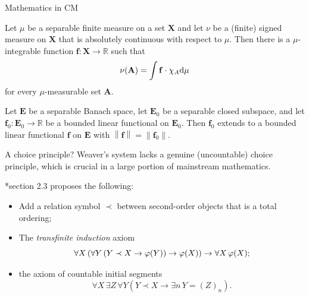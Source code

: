 \documentclass{beamer}
\begin{document}
\begin{frame}{Mathematics in $\mathrm{CM}$}
  \begin{theorem} Let $\mu$ be a separable finite measure on a set $\mathbf{X}$ and let $\nu$ be a (finite) signed measure on $\mathbf{X}$ that is absolutely continuous with respect to $\mu$. Then there is a $\mu$-integrable function $\mathbf{f} : \mathbf{X} \rightarrow \mathbb{R}$ such that
    \[\nu\mleft(\mathbf{A}\mright) = \int \mathbf{f} \cdot \chi_A \mathrm{d}\mu\]
    for every $\mu$-measurable set $\mathbf{A}$.
  \end{theorem}

  \vspace{1em}

  \begin{theorem}
    Let $\mathbf{E}$ be a separable Banach space, let $\mathbf{E}_0$ be a separable closed subspace, and let $\mathbf{f}_0 : \mathbf{E}_0 \rightarrow \mathbb{R}$ be a bounded linear functional on $\mathbf{E}_0$. Then $\mathbf{f}_0$ extends to a bounded linear functional $\mathbf{f}$ on $\mathbf{E}$ with $\left\|\mathbf{f}\right\| = \left\|\mathbf{f}_0\right\|$.
  \end{theorem}
\end{frame}

\begin{frame}{A choice principle?}
  Weaver's system lacks a genuine (uncountable) choice principle, which is crucial in a large portion of mainstream mathematics.

  \vspace{0.6em}

  *{section 2.3} proposes the following:
  \begin{itemize}
    \item Add a relation symbol $\prec$ between second-order objects that is a total ordering;
    \item The \emph{transfinite induction} axiom
          \[\forall X \left(\forall Y \left(Y \prec X \rightarrow \varphi\mleft(Y\mright)\right) \rightarrow \varphi\mleft(X\mright)\right) \rightarrow \forall X \, \varphi\mleft(X\mright);\]
    \item the axiom of countable initial segments
          \[\forall X \, \exists Z \, \forall Y \left(Y \prec X \rightarrow \exists n \, Y = \left(Z\right)_n\right).\]
  \end{itemize}
\end{frame}
\end{document}
